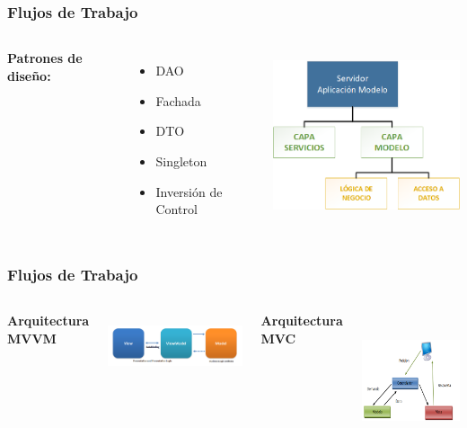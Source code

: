\documentclass[usenames,dvipsnames]{beamer}
\begin{document}
\begin{frame}
\frametitle{Flujos de Trabajo}

\begin{columns}[c] %

\textbf{Patrones de diseño:}
\begin{itemize}
	\item DAO
	\item Fachada
	\item DTO
	\item Singleton
	\item Inversión de Control
\end{itemize}

\includegraphics[height=5cm]{./img/arqmodelo.png}

\end{columns}
\end{frame}


\begin{frame}
\frametitle{Flujos de Trabajo}

\begin{columns}[c] %

\centering
\textbf{Arquitectura MVVM}

\vspace{1.4cm}
\includegraphics[height=2cm]{./img/MVVM.png}


\vspace{0.5cm}
\centering
\textbf{Arquitectura MVC}


\includegraphics[height=4cm]{./img/MVC.png}



\end{columns}
\end{frame}
\end{document}
